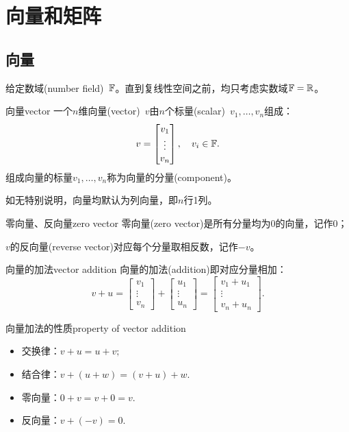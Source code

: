 \chapter{向量和矩阵}

\section{向量}

给定数域(number field)~$\mathbb F$。直到复线性空间之前，均只考虑实数域$\mathbb F=\mathbb R$。

\begin{definition}{向量}{vector}
	一个$n$维向量(vector)~$v$由$n$个标量(scalar)~$v_1,\ldots,v_n$组成：
	\[
		v=\begin{bmatrix}
			v_1\\\vdots\\v_n
		\end{bmatrix},\quad v_i\in\mathbb F.
	\]
	组成向量的标量$v_1,\ldots,v_n$称为向量的分量(component)。
\end{definition}
如无特别说明，向量均默认为列向量，即$n$行1列。
\begin{definition}{零向量、反向量}{zero vector}
	零向量(zero vector)是所有分量均为0的向量，记作0；
	
	$v$的反向量(reverse vector)对应每个分量取相反数，记作$-v$。
\end{definition}
\begin{definition}{向量的加法}{vector addition}
	向量的加法(addition)即对应分量相加：%
	\[
		v+u=\begin{bmatrix}
			v_1\\\vdots\\v_n
		\end{bmatrix}+\begin{bmatrix}
			u_1\\\vdots\\u_n
		\end{bmatrix}=\begin{bmatrix}
			v_1+u_1\\\vdots\\v_n+u_n
		\end{bmatrix}.
	\]
\end{definition}
\begin{theorem}{向量加法的性质}{property of vector addition}
    \begin{itemize}
    	\item 交换律：$v+u=u+v;$
    	\item 结合律：$v+(u+w)=(v+u)+w.$
    	\item 零向量：$0+v=v+0=v.$
    	\item 反向量：$v+(-v)=0.$
    \end{itemize}
\end{theorem}

